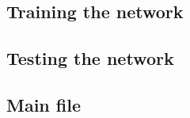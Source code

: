 \documentclass[titlepage]{article}
\theoremstyle{plain}
\theoremstyle{definition}
\begin{document}
		\subsection{Training the network} \label{luaTrain}
		
		\subsection{Testing the network} \label{luaTest}
		
		\subsection{Main file} \label{luaRun}
		
\end{document}

